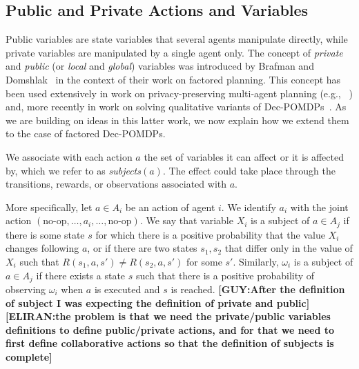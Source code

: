 \documentclass[letterpaper]{article} %
\newcommand{\eliran}[1]{\textbf{[\color{red}ELIRAN:#1]}}
\newcommand{\guy}[1]{\textbf{[\color{orange}GUY:#1]}}
\begin{document}
\subsection{Public and Private Actions and Variables}

Public variables are state variables that several agents manipulate directly, while private variables are manipulated by a single agent only. 
The concept of \emph{private} and \emph{public} (or \emph{local} and \emph{global}) variables was introduced by
Brafman and Domshlak~\cite{} in the context of their work on factored planning. This concept has been used extensively
in work on privacy-preserving multi-agent planning (e.g., ~\cite{}) and, more recently in work on solving qualitative variants of Dec-POMDPs~\cite{}. As we are building on ideas in this latter work, we now explain how we extend them to the
case of factored Dec-POMDPs.


We associate with each action $a$ the set of variables it can affect or it is affected by, which we refer to as  {\em subjects}$(a)$. 
The effect could take place through the transitions, rewards, or observations associated with $a$.

More specifically, let $a\in A_i$ be an action of agent $i$. We identify $a_i$ with the joint action $(\mbox{no-op},\ldots, a_i,\ldots,\mbox{no-op})$.
We say that variable $X_i$ is a subject of $a\in A_j$ if there is some state $s$ for which there is a positive probability that the value 
$X_i$ changes following $a$, or if there are two states $s_1,s_2$ that differ only in the value of $X_i$ such that $R(s_1,a,s')\neq R(s_2,a,s')$ for some $s'$.
Similarly, $\omega_i$ is a subject of $a\in A_j$ if there exists a state $s$ such that there is a positive probability
of observing $\omega_i$ when $a$ is executed and $s$ is reached. 
\guy{After the definition of subject I was expecting the definition of private and public}\eliran{the problem is that we need the private/public variables definitions to define public/private actions, and for that we need to first define collaborative actions so that the definition of subjects is complete}
\end{document}
